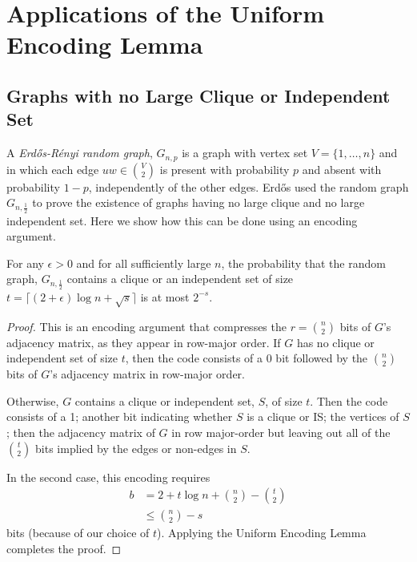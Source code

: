 \documentclass[lotsofwhite]{patmorin}
\begin{document}
\section{Applications of the Uniform Encoding Lemma}


\subsection{Graphs with no Large Clique or Independent Set}


A \emph{Erd\H{o}s-R\'enyi random graph}, $G_{n,p}$ is a graph with vertex
set $V=\{1,\ldots,n\}$ and in which each edge $uw\in \binom{V}{2}$
is present with probability $p$ and absent with probability $1-p$,
independently of the other edges.  Erd\H{o}s \cite{X} used the random
graph $G_{n,\frac{1}{2}}$ to prove the existence of graphs having no
large clique and no large independent set. Here we show how this can be
done using an encoding argument.

\begin{thm}
  For any $\epsilon>0$ and for all sufficiently large $n$, the probability
  that the random graph, $G_{n,\frac{1}{2}}$ contains a clique or an
  independent set of size $t = \lceil(2+\epsilon)\log n + \sqrt{s}\rceil$
  is at most $2^{-s}$.
\end{thm}

\begin{proof}
  This is an encoding argument that compresses the $r=\binom{n}{2}$ bits
  of $G$'s adjacency matrix, as they appear in row-major order.  If $G$
  has no clique or independent set of size $t$, then the code consists of
  a 0 bit followed by the $\binom{n}{2}$ bits of $G$'s adjacency matrix
  in row-major order.
  
  Otherwise, $G$ contains a clique or independent set, $S$, of size $t$.
  Then the code consists of a 1; another bit indicating whether $S$ is a
  clique or IS; the vertices of $S$; then the adjacency matrix of $G$ in
  row major-order but leaving out all of the $\binom{t}{2}$ bits implied
  by the edges or non-edges in $S$.
  
  In the second case, this encoding requires 
  \begin{align*}
     b & = 2 + t\log n + \binom{n}{2}-\binom{t}{2} \\
       & \le \binom{n}{2} - s 
  \end{align*}
  bits (because of our choice of $t$).   Applying the Uniform Encoding
  Lemma completes the proof.
\end{proof}
\end{document}
